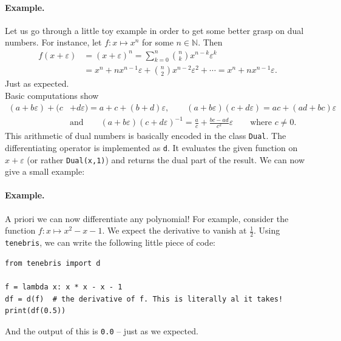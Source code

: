 \documentclass[a4paper, 11pt]{article}
\newcommand{\tenebris}{\texttt{tenebris}}
\begin{document}
    \paragraph{Example.} Let us go through a little toy example in order to
    get some better grasp on dual numbers.
    For instance, let $f\colon x\mapsto x^n$ for some $n\in\mathbb N$.
    Then
    \begin{align*}
        f(x + \varepsilon) &= (x + \varepsilon)^n = \sum^n_{k=0}\binom{n}{k}x^{n-k}\varepsilon^{k}\\
        &= x^n + nx^{n-1}\varepsilon + \binom{n}{2}x^{n-2}\varepsilon^2 + \cdots = x^n + nx^{n-1}\varepsilon.
    \end{align*}
    Just as expected.\\

    Basic computations show
    \begin{align*}
    (a + b\varepsilon) + (c& + d\varepsilon) = a + c + (b + d)\varepsilon,\qquad(a + b\varepsilon)(c + d\varepsilon) = ac + (ad + bc)\varepsilon\\
        &\text{and}\qquad(a + b\varepsilon)(c + d\varepsilon)^{-1} = \frac{a}{c} + \frac{bc - ad}{c^2}\varepsilon\qquad\text{where $c\neq 0$}.
    \end{align*}
    This arithmetic of dual numbers is basically encoded in the class \texttt{Dual}.
    The differentiating operator is implemented as \texttt{d}.
    It evaluates the given function on $x + \varepsilon$ (or rather \texttt{Dual(x,1)}) and returns
    the dual part of the result.
    We can now give a small example:
    \paragraph{Example.} A priori we can now differentiate any polynomial!
    For example, consider the function $f\colon x\mapsto x^2-x-1$.
    We expect the derivative to vanish at $\frac{1}{2}$.
    Using \tenebris{}, we can write the following little piece of code:
    \begin{lstlisting}
from tenebris import d

f = lambda x: x * x - x - 1
df = d(f)  # the derivative of f. This is literally al it takes!
print(df(0.5))
    \end{lstlisting}
    And the output of this is \texttt{0.0} -- just as we expected.
\end{document}
